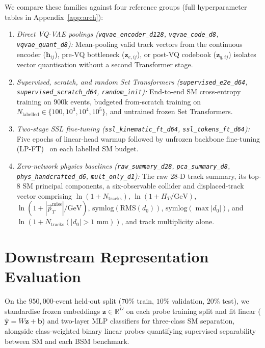 \documentclass{article}
\begin{document}
We compare these families against four reference groups (full hyperparameter tables in Appendix~\ref{app:arch}):
\begin{enumerate}
    \item \emph{Direct VQ-VAE poolings (\texttt{vqvae\_encoder\_d128}, \texttt{vqvae\_code\_d8}, \texttt{vqvae\_quant\_d8}):} Mean-pooling valid track vectors from the continuous encoder ($\mathbf{h}_{ij}$), pre-VQ bottleneck ($\mathbf{z}_{e,ij}$), or post-VQ codebook ($\mathbf{z}_{q,ij}$) isolates vector quantisation without a second Transformer stage.
    \item \emph{Supervised, scratch, and random Set Transformers (\texttt{supervised\_e2e\_d64}, \texttt{supervised\_scratch\_d64}, \texttt{random\_init}):} End-to-end SM cross-entropy training on $900\text{k}$ events, budgeted from-scratch training on $N_{\text{labelled}} \in \{100, 10^3, 10^4, 10^5\}$, and untrained frozen Set Transformers.
    \item \emph{Two-stage SSL fine-tuning (\texttt{ssl\_kinematic\_ft\_d64}, \texttt{ssl\_tokens\_ft\_d64}):} Five epochs of linear-head warmup followed by unfrozen backbone fine-tuning (LP-FT)~\cite{LPFT2022} on each labelled SM budget.
    \item \emph{Zero-network physics baselines (\texttt{raw\_summary\_d28}, \texttt{pca\_summary\_d8}, \texttt{phys\_handcrafted\_d6}, \texttt{mult\_only\_d1}):} The raw 28-D track summary, its top-8 SM principal components, a six-observable collider and displaced-track vector comprising $\ln(1+N_{\text{tracks}})$, $\ln(1+H_T/\text{GeV})$, $\ln(1+|\vec{p}_T^{\text{miss}}|/\text{GeV})$, $\text{symlog}(\text{RMS}(d_0))$, $\text{symlog}(\max|d_0|)$, and $\ln(1+N_{\text{tracks}}(|d_0|>1\text{ mm}))$, and track multiplicity alone.
\end{enumerate}

\section{Downstream Representation Evaluation}
\label{sec:validation}

On the $950,000$-event held-out split ($70\%$ train, $10\%$ validation, $20\%$ test), we standardise frozen embeddings $\mathbf{z} \in \mathbb{R}^D$ on each probe training split and fit linear ($\hat{\mathbf{y}} = W\mathbf{z} + \mathbf{b}$) and two-layer MLP classifiers for three-class SM separation, alongside class-weighted binary linear probes quantifying supervised separability between SM and each BSM benchmark.
\end{document}
